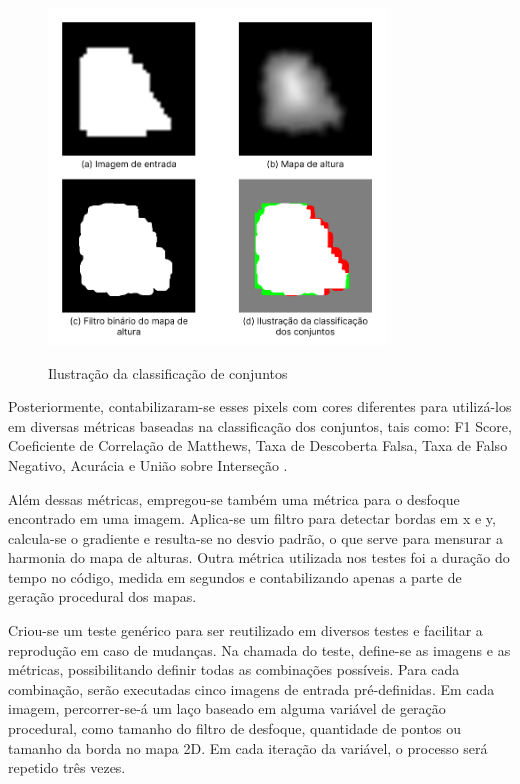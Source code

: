 \begin{figure}[!ht]
	\centering
    \caption{Ilustração da classificação de conjuntos}
	\includegraphics[width=0.8\textwidth]{figures/representacao_classificacao.png}
	\label{fig:representacao}
\end{figure}

Posteriormente, contabilizaram-se esses pixels com cores diferentes para utilizá-los em diversas métricas baseadas na classificação dos conjuntos, tais como: F1 Score, Coeficiente de Correlação de Matthews, Taxa de Descoberta Falsa, Taxa de Falso Negativo, Acurácia e União sobre Interseção \cite{Chicco2020, confusion_matrix_calculator, iou_metric_link}.

Além dessas métricas, empregou-se também uma métrica para o desfoque encontrado em uma imagem. Aplica-se um filtro para detectar bordas em x e y, calcula-se o gradiente e resulta-se no desvio padrão, o que serve para mensurar a harmonia do mapa de alturas. Outra métrica utilizada nos testes foi a duração do tempo no código, medida em segundos e contabilizando apenas a parte de geração procedural dos mapas.

Criou-se um teste genérico para ser reutilizado em diversos testes e facilitar a reprodução em caso de mudanças. Na chamada do teste, define-se as imagens e as métricas, possibilitando definir todas as combinações possíveis. Para cada combinação, serão executadas cinco imagens de entrada pré-definidas. Em cada imagem, percorrer-se-á um laço baseado em alguma variável de geração procedural, como tamanho do filtro de desfoque, quantidade de pontos ou tamanho da borda no mapa 2D. Em cada iteração da variável, o processo será repetido três vezes.

